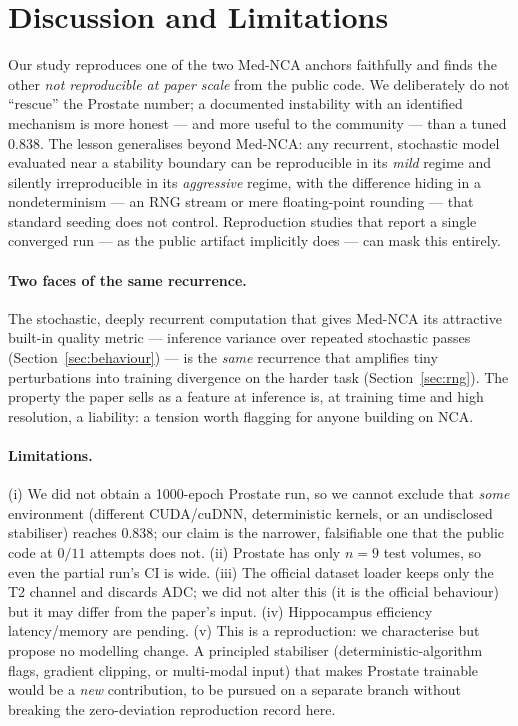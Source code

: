 \documentclass[10pt,twocolumn]{article}
\begin{document}
\section{Discussion and Limitations}
\label{sec:discussion}

Our study reproduces one of the two Med-NCA anchors faithfully and finds
the other \emph{not reproducible at paper scale} from the public code. We
deliberately do not ``rescue'' the Prostate number; a documented
instability with an identified mechanism is more honest --- and more useful
to the community --- than a tuned $0.838$. The lesson generalises beyond
Med-NCA: any recurrent, stochastic model evaluated near a stability
boundary can be reproducible in its \emph{mild} regime and silently
irreproducible in its \emph{aggressive} regime, with the difference hiding
in a nondeterminism --- an RNG stream or mere floating-point rounding ---
that standard seeding does not control. Reproduction
studies that report a single converged run --- as the public artifact
implicitly does --- can mask this entirely.

\paragraph{Two faces of the same recurrence.}
The stochastic, deeply recurrent computation that gives Med-NCA its
attractive built-in quality metric --- inference variance over repeated
stochastic passes (Section~\ref{sec:behaviour}) --- is the \emph{same}
recurrence that amplifies tiny perturbations into training divergence on the
harder task (Section~\ref{sec:rng}). The property the paper sells as a
feature at inference is, at training time and high resolution, a liability:
a tension worth flagging for anyone building on NCA.

\paragraph{Limitations.}
(i) We did not obtain a 1000-epoch Prostate run, so we cannot exclude that
\emph{some} environment (different CUDA/cuDNN, deterministic kernels, or an
undisclosed stabiliser) reaches $0.838$; our claim is the narrower,
falsifiable one that the public code at $0/11$ attempts does not.
(ii) Prostate has only $n=9$ test volumes, so even the partial run's CI is
wide. (iii) The official dataset loader keeps only the T2 channel and
discards ADC; we did not alter this (it is the official behaviour) but it
may differ from the paper's input. (iv) Hippocampus efficiency
latency/memory are pending. (v) This is a reproduction: we characterise but
propose no modelling change. A principled stabiliser (deterministic-algorithm
flags, gradient clipping, or multi-modal input) that makes Prostate
trainable would be a \emph{new} contribution, to be pursued on a separate
branch without breaking the zero-deviation reproduction record here.
\end{document}
